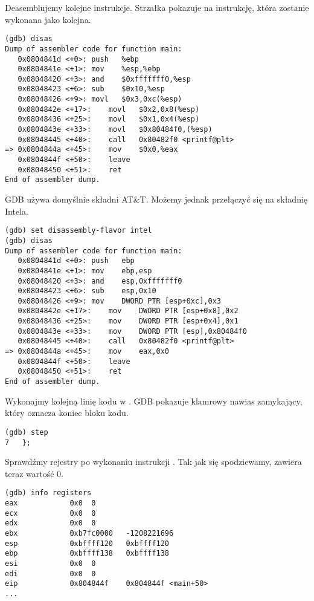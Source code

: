 Deasemblujemy kolejne instrukcje.
Strzałka pokazuje na instrukcję, która zostanie wykonana jako kolejna.

\begin{lstlisting}[style=customasmx86]
(gdb) disas
Dump of assembler code for function main:
   0x0804841d <+0>:	push   %ebp
   0x0804841e <+1>:	mov    %esp,%ebp
   0x08048420 <+3>:	and    $0xfffffff0,%esp
   0x08048423 <+6>:	sub    $0x10,%esp
   0x08048426 <+9>:	movl   $0x3,0xc(%esp)
   0x0804842e <+17>:	movl   $0x2,0x8(%esp)
   0x08048436 <+25>:	movl   $0x1,0x4(%esp)
   0x0804843e <+33>:	movl   $0x80484f0,(%esp)
   0x08048445 <+40>:	call   0x80482f0 <printf@plt>
=> 0x0804844a <+45>:	mov    $0x0,%eax
   0x0804844f <+50>:	leave
   0x08048450 <+51>:	ret
End of assembler dump.
\end{lstlisting}

\ac{GDB} używa domyślnie składni AT\&T.
Możemy jednak przełączyć się na składnię Intela.

\begin{lstlisting}[style=customasmx86]
(gdb) set disassembly-flavor intel
(gdb) disas
Dump of assembler code for function main:
   0x0804841d <+0>:	push   ebp
   0x0804841e <+1>:	mov    ebp,esp
   0x08048420 <+3>:	and    esp,0xfffffff0
   0x08048423 <+6>:	sub    esp,0x10
   0x08048426 <+9>:	mov    DWORD PTR [esp+0xc],0x3
   0x0804842e <+17>:	mov    DWORD PTR [esp+0x8],0x2
   0x08048436 <+25>:	mov    DWORD PTR [esp+0x4],0x1
   0x0804843e <+33>:	mov    DWORD PTR [esp],0x80484f0
   0x08048445 <+40>:	call   0x80482f0 <printf@plt>
=> 0x0804844a <+45>:	mov    eax,0x0
   0x0804844f <+50>:	leave
   0x08048450 <+51>:	ret
End of assembler dump.
\end{lstlisting}

Wykonajmy kolejną linię kodu w \CCpp{}.
\ac{GDB} pokazuje klamrowy nawias zamykający, który oznacza koniec bloku kodu.

\begin{lstlisting}
(gdb) step
7	};
\end{lstlisting}

Sprawdźmy rejestry po wykonaniu instrukcji . Tak jak się spodziewamy, \EAX zawiera teraz wartość 0.

\begin{lstlisting}
(gdb) info registers
eax            0x0	0
ecx            0x0	0
edx            0x0	0
ebx            0xb7fc0000	-1208221696
esp            0xbffff120	0xbffff120
ebp            0xbffff138	0xbffff138
esi            0x0	0
edi            0x0	0
eip            0x804844f	0x804844f <main+50>
...
\end{lstlisting}
